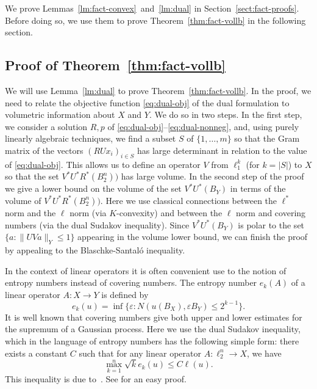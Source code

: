 \documentclass[11pt]{article}
\begin{document}
We prove Lemmas~\ref{lm:fact-convex}~and~\ref{lm:dual} in
Section~\ref{sect:fact-proofs}. Before doing so, we use them to prove
Theorem~\ref{thm:fact-vollb} in the following section. 

\subsection{Proof of Theorem~\ref{thm:fact-vollb}}
\label{sect:fact-pf}

We will use Lemma~\ref{lm:dual} to prove Theorem~\ref{thm:fact-vollb}.
In the proof, we need to relate the objective function
\eqref{eq:dual-obj} of the dual formulation to volumetric information
about $X$ and $Y$. We do so in two steps. In the first step, we
consider a solution $R, p$ of
\eqref{eq:dual-obj}--\eqref{eq:dual-nonneg}, and, using purely
linearly algebraic techniques, we find a subset $S$ of $\{1, \ldots,
m\}$ so that the Gram matrix of the vectors $(RUx_i)_{i \in S}$ has large
determinant  in relation to the value of
\eqref{eq:dual-obj}. This allows us to define an operator $V$ from
$\ell_1^k$ (for  $k = |S|$) to $X$ so that the set
$V^*U^*R^*(B_2^n))$ has large volume. In the second step of the proof
we give a lower bound on the volume of the set $V^*U^*(B_Y)$ in terms
of the volume of $V^*U^*R^*(B_2^n))$. Here we use classical
connections between the $\ell^*$ norm and the $\ell$ norm (via
$K$-convexity) and between the $\ell$ norm and covering numbers (via
the dual Sudakov inequality). Since $V^*U^*(B_Y)$ is polar to the set
$\{a: \|UVa\|_Y \le 1\}$ appearing in the volume lower bound, we can
finish the proof by appealing to the Blaschke-Santal\'o inequality.


In the context of linear operators it is often convenient use to the
notion of entropy numbers instead of covering numbers.  The entropy
number $e_k(A)$ of a linear operator $A:X \to Y$ is defined by
\[
e_k(u) = \inf\{\varepsilon: N(u(B_X), \varepsilon B_Y) \le 2^{k-1}\}. 
\]
It is well known that covering numbers give both upper and lower
estimates for the supremum of a Gaussian process. Here we use the dual
Sudakov inequality, which in the language of entropy numbers has the
following simple form: there exists a constant $C$ such that for any
linear operator $A:\ell_2^n \to X$, we have
\begin{equation}
  \label{eq:sudakov}
  \max_{k = 1}^n \sqrt{k}e_k(u) \le C\ell(u). 
\end{equation}
This inequality is due to~\cite{PTJ85}. See \cite[Section
3.3]{LT91-book} for an easy proof. 
\end{document}
